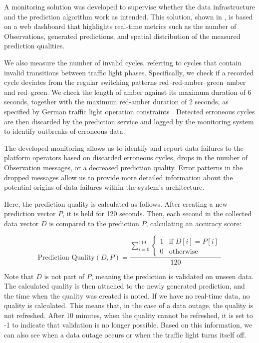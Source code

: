A monitoring solution was developed to supervise whether the data infrastructure and the prediction algorithm work as intended. This solution, shown in , is based on a web dashboard that highlights real-time metrics such as the number of Observations, generated predictions, and spatial distribution of the measured prediction qualities. 

We also measure the number of invalid cycles, referring to cycles that contain invalid transitions between traffic light phases. Specifically, we check if a recorded cycle deviates from the regular switching patterns red--red-amber--green--amber and red--green. We check the length of amber against its maximum duration of 6 seconds, together with the maximum red-amber duration of 2 seconds, as specified by German traffic light operation constraints \cite{TN_libero_mab2}. Detected erroneous cycles are then discarded by the prediction service and logged by the monitoring system to identify outbreaks of erroneous data.

The developed monitoring allows us to identify and report data failures to the platform operators based on discarded erroneous cycles, drops in the number of Observation messages, or a decreased prediction quality. Error patterns in the dropped messages allow us to provide more detailed information about the potential origins of data failures within the system's architecture.

Here, the prediction quality is calculated as follows. After creating a new prediction vector $P$, it is held for 120 seconds. Then, each second in the collected data vector $D$ is compared to the prediction $P$, calculating an accuracy score:


\begin{equation} 
\text{Prediction Quality}(D, P) = 
\frac{
\sum_{i=0}^{119} 
\left\{
\begin{array}{ll}
1 & \text{if } D[i] = P[i] \\
0 & \text{otherwise}
\end{array} 
\right.
}{
120
}
\end{equation}\label{eq:predictionquality}

Note that $D$ is not part of $P$, meaning the prediction is validated on unseen data. The calculated quality is then attached to the newly generated prediction, and the time when the quality was created is noted. If we have no real-time data, no quality is calculated. This means that, in the case of a data outage, the quality is not refreshed. After 10 minutes, when the quality cannot be refreshed, it is set to -1 to indicate that validation is no longer possible. Based on this information, we can also see when a data outage occurs or when the traffic light turns itself off.

